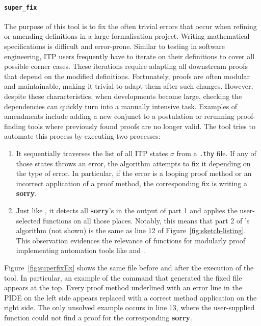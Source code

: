 \documentclass[10pt,conference]{IEEEtran}
\newcommand{\isakw}[1]{{\bfseries\ttfamily\def\isachardot{.}\def\isacharunderscore{\isacharunderscorekeyword}%
\def\isacharbraceleft{\{}\def\isacharbraceright{\}}#1}}
\renewcommand{\isacommand}[1]{\textcolor{IsaBlue}{\isakw{#1}}}
\begin{document}
\paragraph{\textbf{\texttt{super\_fix}}} The purpose of this tool is to fix the often trivial errors that occur when refining or amending definitions in a large formalisation project. Writing mathematical specifications is difficult and error-prone. Similar to testing in software engineering, ITP users frequently have to iterate on their definitions to cover all possible corner cases. These iterations require adapting all downstream proofs that depend on the modified definitions. Fortunately, proofs are often modular and maintainable, making it trivial to adapt them after such changes. However, despite these characteristics, when developments become large, checking the dependencies can quickly turn into a manually intensive task. Examples of amendments include adding a new conjunct to a postulation or rerunning proof-finding tools where previously found proofs are no longer valid. The \superfix{} tool tries to automate this process by executing two processes: 
\begin{enumerate}
    \item It sequentially traverses the list of all ITP states $\sigma$ from a \texttt{.thy} file. If any of those states throws an error, the algorithm attempts to fix it depending on the type of error. In particular, if the error is a looping proof method or an incorrect application of a proof method, the corresponding fix is writing a \isacommand{sorry}.
    \item Just like \supersketch{}, it detects all \isacommand{sorry}'s in the output of part 1 and applies the user-selected \frameterm functions on all those places. Notably, this means that part 2 of \superfix{}'s algorithm (not shown) is the same as line 12 of Figure~\ref{fig:sketch-listing}. This observation evidences the relevance of \frameterm functions for modularly proof implementing automation tools like \supersketch{} and \superfix{}.
\end{enumerate}

Figure~\ref{fig:superfixEx} shows the same file before and after the execution of the \superfix{} tool. In particular, an example of the command that generated the fixed file appears at the top. Every proof method underlined with an error line in the PIDE on the left side appears replaced with a correct method application on the right side. The only unsolved example occurs in line 13, where the user-supplied \frameterm function could not find a proof for the corresponding \isacommand{sorry}.
\end{document}
